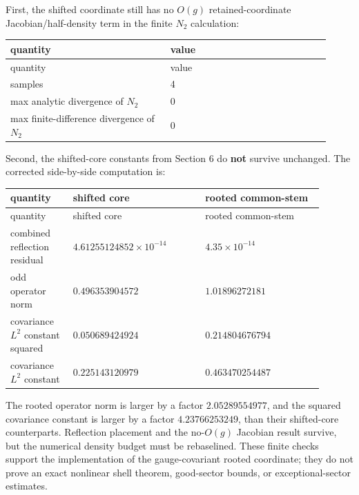 \documentclass[10pt]{article}
\begin{document}
First, the shifted coordinate still has no \(O(g)\) retained-coordinate Jacobian/half-density term in the finite \(N_2\) calculation:

\begin{center}
\small
\begin{longtable}{|p{0.46\linewidth}|p{0.46\linewidth}|}
\hline
quantity & value \\
\hline
\endfirsthead
\hline
quantity & value \\
\hline
\endhead
samples & 4 \\
\hline
max analytic divergence of \(N_2\) & 0 \\
\hline
max finite-difference divergence of \(N_2\) & 0 \\
\hline
\end{longtable}
\end{center}

Second, the shifted-core constants from Section 6 do \textbf{not} survive unchanged.  The corrected side-by-side computation is:

\begin{center}
\small
\begin{longtable}{|>{\raggedright\arraybackslash}p{0.18\linewidth}|>{\raggedright\arraybackslash}p{0.38\linewidth}|>{\raggedright\arraybackslash}p{0.34\linewidth}|}
\hline
quantity & shifted core & rooted common-stem \\
\hline
\endfirsthead
\hline
quantity & shifted core & rooted common-stem \\
\hline
\endhead
combined reflection residual & \(4.61255124852\times10^{-14}\) & \(4.35\times10^{-14}\) \\
\hline
odd operator norm & \(0.496353904572\) & \(1.01896272181\) \\
\hline
covariance \(L^2\) constant squared & \(0.050689424924\) & \(0.214804676794\) \\
\hline
covariance \(L^2\) constant & \(0.225143120979\) & \(0.463470254487\) \\
\hline
\end{longtable}
\end{center}

The rooted operator norm is larger by a factor \(2.05289554977\), and the squared covariance constant is larger by a factor \(4.23766253249\), than their shifted-core counterparts.  Reflection placement and the no-\(O(g)\) Jacobian result survive, but the numerical density budget must be rebaselined.  These finite checks support the implementation of the gauge-covariant rooted coordinate; they do not prove an exact nonlinear shell theorem, good-sector bounds, or exceptional-sector estimates.
\end{document}
